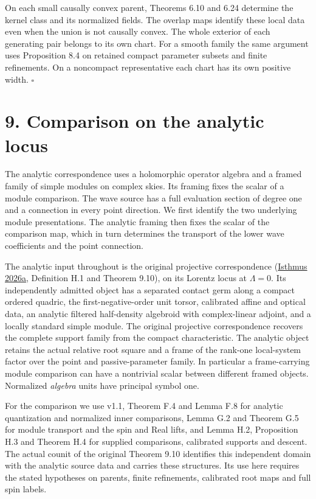 \documentclass[
  english,
  11pt,
  reqno]{amsart}
\begin{document}
On each small causally convex parent, Theorems 6.10 and 6.24 determine
the kernel class and its normalized fields. The overlap maps identify
these local data even when the union is not causally convex. The whole
exterior of each generating pair belongs to its own chart. For a smooth
family the same argument uses Proposition 8.4 on retained compact
parameter subsets and finite refinements. On a noncompact representative
each chart has its own positive width. \hfill\(\square\)

\section{9. Comparison on the analytic
locus}\label{comparison-on-the-analytic-locus}\label{sec:analytic-wave-comparison}

The analytic correspondence uses a holomorphic operator algebra and a
framed family of simple modules on complex skies. Its framing fixes the
scalar of a module comparison. The wave source has a full evaluation
section of degree one and a connection in every point direction. We
first identify the two underlying module presentations. The analytic
framing then fixes the scalar of the comparison map, which in turn
determines the transport of the lower wave coefficients and the point
connection.

The analytic input throughout is the original projective correspondence
(\hyperref[ref-IsthmusLocal2026]{Isthmus 2026a}, Definition H.1 and
Theorem 9.10), on its Lorentz locus at \(\Lambda=0\). Its independently
admitted object has a separated contact germ along a compact ordered
quadric, the first-negative-order unit torsor, calibrated affine and
optical data, an analytic filtered half-density algebroid with
complex-linear adjoint, and a locally standard simple module. The
original projective correspondence recovers the complete support family
from the compact characteristic. The analytic object retains the actual
relative root square and a frame of the rank-one local-system factor
over the point and passive-parameter family. In particular a
frame-carrying module comparison can have a nontrivial scalar between
different framed objects. Normalized \emph{algebra} units have principal
symbol one.

For the comparison we use v1.1, Theorem F.4 and Lemma F.8 for analytic
quantization and normalized inner comparisons, Lemma G.2 and Theorem G.5
for module transport and the spin and Real lifts, and Lemma H.2,
Proposition H.3 and Theorem H.4 for supplied comparisons, calibrated
supports and descent. The actual counit of the original Theorem 9.10
identifies this independent domain with the analytic source data and
carries these structures. Its use here requires the stated hypotheses on
parents, finite refinements, calibrated root maps and full spin labels.
\end{document}
